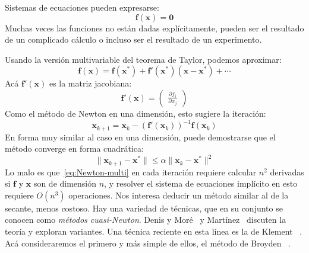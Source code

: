   Sistemas de ecuaciones pueden expresarse:
  \begin{equation*}
    \mathbf{f}(\mathbf{x})
      = \mathbf{0}
  \end{equation*}
  Muchas veces las funciones no están dadas explícitamente,
  pueden ser el resultado de un complicado cálculo
  o incluso ser el resultado de un experimento.

  Usando la versión multivariable del teorema de Taylor,
  podemos aproximar:
  \begin{equation}
    \label{eq:Taylor-multi}
    \mathbf{f}(\mathbf{x})
      = \mathbf{f}(\mathbf{x}^*)
          + \mathbf{f}'(\mathbf{x}^*) (\mathbf{x} - \mathbf{x}^*)
          + \dotsb
  \end{equation}
  Acá \(\mathbf{f}'(\mathbf{x})\) es la matriz jacobiana:
  \begin{equation}
    \label{eq:Newton-multi}
    \mathbf{f}'(\mathbf{x})
      = \begin{pmatrix}
          \frac{\partial f_i}{\partial x_j}
        \end{pmatrix}
  \end{equation}
  Como el método de Newton en una dimensión,
  esto sugiere la iteración:
  \begin{equation*}
    \mathbf{x}_{k + 1}
      = \mathbf{x}_k
          - (\mathbf{f}'(\mathbf{x}_k))^{-1} \mathbf{f}(\mathbf{x}_k)
  \end{equation*}
  En forma muy similar al caso en una dimensión,
  puede demostrarse que el método converge en forma cuadrática:
  \begin{equation*}
    \lVert \mathbf{x}_{k + 1} - \mathbf{x}^* \rVert
      \le \alpha \lVert \mathbf{x}_k - \mathbf{x}^* \rVert^2
  \end{equation*}
  Lo malo es que~\eqref{eq:Newton-multi} en cada iteración
  requiere calcular \(n^2\) derivadas
  si \(\mathbf{f}\) y \(\mathbf{x}\) son de dimensión \(n\),
  y resolver el sistema de ecuaciones implícito en esto
  requiere \(O(n^3)\) operaciones.
  Nos interesa deducir un método similar al de la secante,
  menos costoso.
  Hay una variedad de técnicas,
  que en su conjunto se conocen como \emph{métodos cuasi-Newton}.
  Denis y Moré~%
   \cite{dennis77:_quasi_newton_methods}
  y Martínez~%
    \cite{martinez00:_pract_quasi_newton_method_solving_nonlin_system}
  discuten la teoría y exploran variantes.
  Una técnica reciente en esta línea es la de Klement~%
    \cite{klement14:_using_quasi_newton_algor}.
  Acá consideraremos el primero y más simple de ellos,
  el método de Broyden~%
    \cite{broyden65:_solving_nonlin_simul_equat}.

